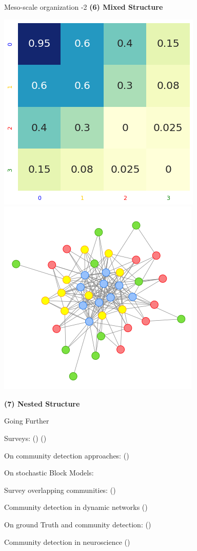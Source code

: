 \documentclass[a4paper,11pt]{book}
\begin{document}
\begin{textbox}{Meso-scale organization -2}
\textbf{(6) Mixed Structure
}




\includegraphics[height=0.45\textwidth]{pics/SBM/nestedBB.png}
\includegraphics[height=0.45\textwidth]{pics/SBM/nestedG.png}

\textbf{(7) Nested Structure}
\end{textbox}


\begin{textbox}{Going Further}

Surveys: (\cite{fortunato2010community}) (\cite{fortunato2016community})

On community detection approaches: (\cite{rosvall2019different})

On stochastic Block Models:\cite{funke2019stochastic}

Survey overlapping communities: (\cite{xie2013overlapping})

Community detection in dynamic networks (\cite{rossetti2018community})

On ground Truth and community detection: (\cite{peel2017ground})

Community detection in neuroscience (\cite{betzel2020community})



\end{textbox}




\end{document}
